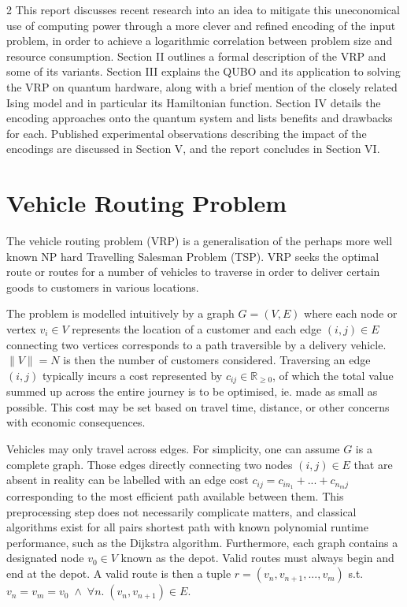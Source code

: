 \documentclass [10pt]{article}
\newcommand {\qnorm}[1] {\lVert #1 \rVert}
\begin{document}
\begin {multicols}{2}
This report discusses recent research into an idea to mitigate this
uneconomical use of computing power through a more clever and refined 
encoding of the input problem, in order to achieve a logarithmic correlation
between problem size and resource consumption.
Section II outlines a formal description of the VRP and some of its variants.
Section III explains the QUBO and its application to solving the VRP on
quantum hardware, along with a brief mention of the closely related
Ising model and in particular its Hamiltonian function.
Section IV details the encoding approaches onto the quantum system and lists
benefits and drawbacks for each.
Published experimental observations describing the impact of the encodings
are discussed in Section V,
and the report concludes in Section VI.

\section {Vehicle Routing Problem}
The vehicle routing problem (VRP) is a generalisation of the perhaps more
well known NP hard Travelling Salesman Problem (TSP). VRP seeks the optimal
route or routes for a number of vehicles to traverse in order to deliver
certain goods to customers in various locations.

The problem is modelled intuitively by a graph $G = (V, E)$
where each node or vertex $v_i \in V$ represents the location of a customer 
and each edge $(i, j) \in E$ connecting two vertices corresponds to a path
traversible by a delivery vehicle. $\qnorm{V} = N$ is then the number
of customers considered. Traversing an edge $(i, j)$ typically incurs
a cost represented by $c_{ij} \in \mathbb R_{\ge 0}$, of which the total
value summed up across the entire journey is to be optimised, ie. made as
small as possible. This cost may be set based on travel time, distance,
or other concerns with economic consequences.

Vehicles may only travel across edges. For simplicity, one can assume $G$ is
a complete graph. Those edges directly connecting two nodes $(i, j) \in E$
that are absent in reality can be labelled with an edge cost
$c_{ij} = c_{i n_1} + ... + c_{n_m j}$ corresponding to
the most efficient path available between them. This preprocessing step does
not necessarily complicate matters, and classical algorithms exist for all
pairs shortest path with known polynomial runtime performance, such as
the Dijkstra algorithm. Furthermore, each graph contains a
designated node $v_0 \in V$ known as the depot. Valid routes must always
begin and end at the depot. A valid route is then a tuple
$r = (v_n, v_{n+1}, ..., v_m)$ s.t.
$v_n = v_m = v_0 \; \land \; \forall n. \; (v_n, v_{n+1}) \in E$.


\end{multicols}
\end{document}

